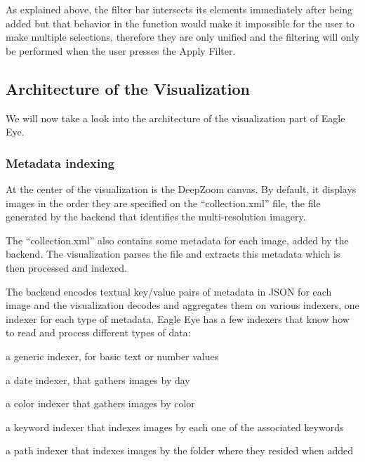 As explained above, the filter bar intersects its elements immediately after being added but that behavior in the function would make it impossible for the user to make multiple selections, therefore they are only unified and the filtering will only be performed when the user presses the Apply Filter.




\subsection{Architecture of the Visualization}

We will now take a look into the architecture of the visualization part of Eagle Eye.


\subsubsection{Metadata indexing}

At the center of the visualization is the DeepZoom canvas. By default, it displays images in the order they are specified on the ``collection.xml'' file, the file generated by the backend that identifies the multi-resolution imagery.

The ``collection.xml'' also contains some metadata for each image, added by the backend. The visualization parses the file and extracts this metadata which is then processed and indexed.

The backend encodes textual key/value pairs of metadata in JSON for each image and the visualization decodes and aggregates them on various indexers, one indexer for each type of metadata. Eagle Eye has a few indexers that know how to read and process different types of data:
\begin{myitemize}
	\item{a generic indexer, for basic text or number values}
	\item{a date indexer, that gathers images by day}
	\item{a color indexer that gathers images by color}
	\item{a keyword indexer that indexes images by each one of the associated keywords}
	\item{a path indexer that indexes images by the folder where they resided when added}
\end{myitemize}

